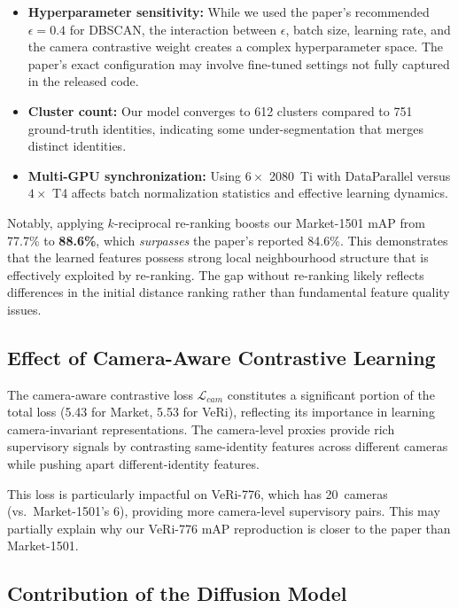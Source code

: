 \begin{itemize}
    \item \textbf{Hyperparameter sensitivity:} While we used the paper's recommended $\epsilon = 0.4$ for DBSCAN, the interaction between $\epsilon$, batch size, learning rate, and the camera contrastive weight creates a complex hyperparameter space. The paper's exact configuration may involve fine-tuned settings not fully captured in the released code.
    \item \textbf{Cluster count:} Our model converges to 612 clusters compared to 751 ground-truth identities, indicating some under-segmentation that merges distinct identities.
    \item \textbf{Multi-GPU synchronization:} Using $6 \times$ 2080~Ti with DataParallel versus $4 \times$ T4 affects batch normalization statistics and effective learning dynamics.
\end{itemize}

Notably, applying $k$-reciprocal re-ranking \cite{zhong2017reranking} boosts our Market-1501 mAP from 77.7\% to \textbf{88.6\%}, which \textit{surpasses} the paper's reported 84.6\%. This demonstrates that the learned features possess strong local neighbourhood structure that is effectively exploited by re-ranking. The gap without re-ranking likely reflects differences in the initial distance ranking rather than fundamental feature quality issues.

\subsection{Effect of Camera-Aware Contrastive Learning}

The camera-aware contrastive loss $\mathcal{L}_{cam}$ constitutes a significant portion of the total loss (5.43 for Market, 5.53 for VeRi), reflecting its importance in learning camera-invariant representations. The camera-level proxies provide rich supervisory signals by contrasting same-identity features across different cameras while pushing apart different-identity features.

This loss is particularly impactful on VeRi-776, which has 20~cameras (vs.\ Market-1501's 6), providing more camera-level supervisory pairs. This may partially explain why our VeRi-776 mAP reproduction is closer to the paper than Market-1501.

\subsection{Contribution of the Diffusion Model}

